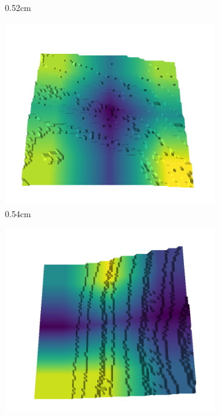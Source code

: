 \documentclass[../document.tex]{subfiles}
\begin{document}
\begin{figure}[H]
\begin{subfigure}[b]{0.192\linewidth}
    \caption{0.52cm}
    \label{fig : quarry-best-10}
    \end{subfigure}
    \begin{subfigure}[b]{0.192\linewidth}
    \includegraphics[width=\linewidth]{../img/5/quarry/best/54-patch-3d-majavi-colormap-100.png}
    \caption{0.54cm}
    \label{fig : quarry-best-11}
    \end{subfigure}
    \begin{subfigure}[b]{0.192\linewidth}
    \includegraphics[width=\linewidth]{../img/5/quarry/best/56-patch-3d-majavi-colormap-110.png}

\end{subfigure}
\end{figure}
\end{document}
